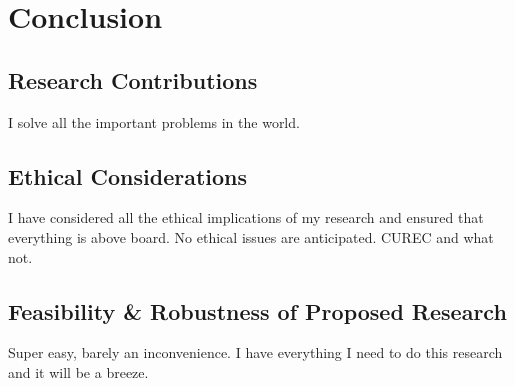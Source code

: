 \chapter{Conclusion}
\section{Research Contributions}
I solve all the important problems in the world.

\section{Ethical Considerations}
I have considered all the ethical implications of my research and ensured that everything is above board. No ethical issues are anticipated. CUREC and what not.


\section{Feasibility \& Robustness of Proposed Research}
Super easy, barely an inconvenience. I have everything I need to do this research and it will be a breeze.